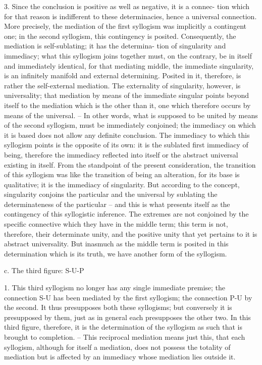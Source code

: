 3. Since the conclusion is positive as well as negative, it is a connec-
tion which for that reason is indifferent to these determinacies, hence a
universal connection. More precisely, the mediation of the first syllogism
was implicitly a contingent one; in the second syllogism, this contingency is
posited. Consequently, the mediation is self-sublating; it has the determina-
tion of singularity and immediacy; what this syllogism joins together must,
on the contrary, be in itself and immediately identical, for that mediating
middle, the immediate singularity, is an infinitely manifold and external
determining. Posited in it, therefore, is rather the self-external mediation.
The externality of singularity, however, is universality; that mediation by
means of the immediate singular points beyond itself to the mediation
which is the other than it, one which therefore occurs by means of the
universal. – In other words, what is supposed to be united by means of
the second syllogism, must be immediately conjoined; the immediacy on
which it is based does not allow any definite conclusion. The immediacy
to which this syllogism points is the opposite of its own: it is the sublated
first immediacy of being, therefore the immediacy reflected into itself or
the abstract universal existing in itself.
From the standpoint of the present consideration, the transition of
this syllogism was like the transition of being an alteration, for its base
is qualitative; it is the immediacy of singularity. But according to the
concept, singularity conjoins the particular and the universal by sublating
the determinateness of the particular – and this is what presents itself as the
contingency of this syllogistic inference. The extremes are not conjoined
by the specific connective which they have in the middle term; this term
is not, therefore, their determinate unity, and the positive unity that yet
pertains to it is abstract universality. But inasmuch as the middle term is
posited in this determination which is its truth, we have another form of
the syllogism.

c. The third figure: S-U-P

1. This third syllogism no longer has any single immediate premise; the
connection S-U has been mediated by the first syllogism; the connection
P-U by the second. It thus presupposes both these syllogisms; but conversely
it is presupposed by them, just as in general each presupposes the other
two. In this third figure, therefore, it is the determination of the syllogism
as such that is brought to completion. – This reciprocal mediation means
just this, that each syllogism, although for itself a mediation, does not
possess the totality of mediation but is affected by an immediacy whose
mediation lies outside it.

